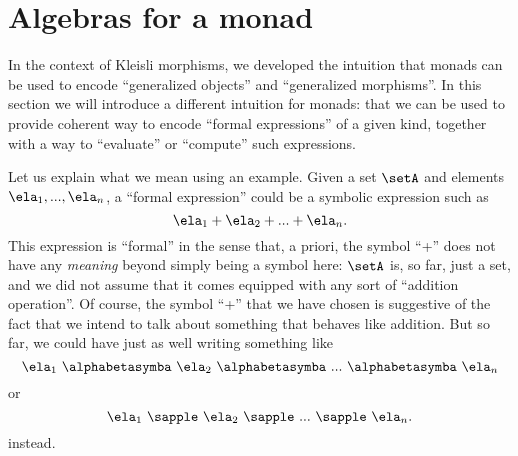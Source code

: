 

\section{Algebras for a monad}
\label{sec:Eilenberg-Moore}

In the context of Kleisli morphisms, we developed the intuition that monads can be used to encode ``generalized objects'' and ``generalized morphisms''. In this section we will introduce a different intuition for monads: that we can be used to provide coherent way to encode ``formal expressions'' of a given kind, together with a way to ``evaluate'' or ``compute'' such expressions. 

Let us explain what we mean using an example. Given a set $\setA$ and elements $\ela_1, ..., \ela_n$, a ``formal expression'' could be a symbolic expression such as 
\begin{equation}\label{eq:formal-sum}
\ela_1 + \ela_2 + ... + \ela_n.
\end{equation}
This expression is ``formal'' in the sense that, a priori, the symbol ``+'' does not have any \emph{meaning} beyond simply being a symbol here: $\setA$ is, so far, just a set, and we did not assume that it comes equipped with any sort of ``addition operation''. Of course, the symbol ``+'' that we have chosen is suggestive of the fact that we intend to talk about something that behaves like addition. But so far, we could have just as well writing something like
\begin{equation}\label{eq:formal-zodiac-sum}
\ela_1 \  \alphabetasymba \ \ela_2 \ \alphabetasymba \ ...  \ \alphabetasymba \  \ela_n
\end{equation}
or 
\begin{equation}\label{eq:formal-apple-sum}
\ela_1 \ \sapple \ \ela_2 \ \sapple \ ... \ \sapple  \ \ela_n.
\end{equation}
instead. 
